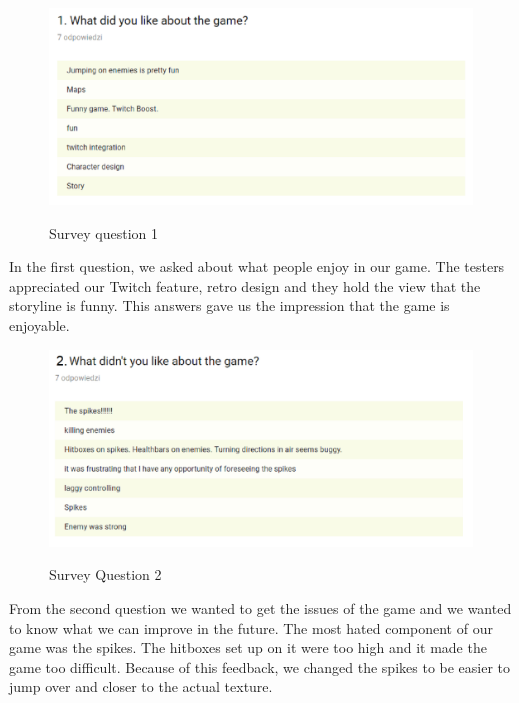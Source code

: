 \documentclass[12p]{article}
\begin{document}
\begin{figure}[ht]
 \center
 \includegraphics[width=1\textwidth]{SurveyQuestions/1.png}
 \label{fig:survey_question_1}
 \caption{Survey question 1}
\end{figure}

In the first question, we asked about what people enjoy in our game. The testers appreciated our Twitch feature, retro design and they hold the view that the storyline is funny. This answers gave us the impression that the game is enjoyable.

\newpage

\begin{figure}[ht]
 \center
 \includegraphics[width=1\textwidth]{SurveyQuestions/2.png}
 \label{fig:survey_question_2}
 \caption{Survey Question 2}
\end{figure}

From the second question we wanted to get the issues of the game and we wanted to know what we can improve in the future. The most hated component of our game was the spikes. The hitboxes set up on it were too high and it made the game too difficult. Because of this feedback, we changed the spikes to be easier to jump over and closer to the actual texture.

\newpage
\end{document}
